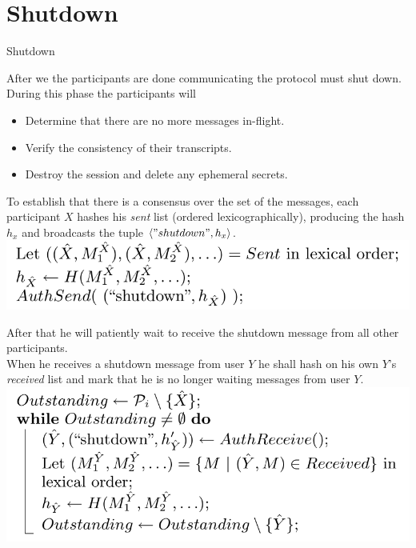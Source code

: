 \section{Shutdown}

\begin{frame}
\Huge{\centerline{Shutdown}}
\end{frame}

\begin{frame}
After we the participants are done communicating the protocol must shut down.
\vfill
During this phase the participants will

  \begin{itemize}
    \item Determine that there are no more messages in-flight.
    \item Verify the consistency of their transcripts.
    \item Destroy the session and delete any ephemeral secrets.
  \end{itemize}
\end{frame}


\begin{frame}
To establish that there is a consensus over the set of the messages, each participant $X$ hashes his \emph{sent} list (ordered lexicographically), producing the hash $h_x$ and broadcasts the tuple $\langle "shutdown", h_x \rangle$.\\[0.5cm]

\includegraphics[scale=0.4]{Figures/sent_hash.png}
\end{frame}

\begin{frame}
After that he will patiently wait to receive the shutdown message from all  other participants.\\[0.5cm]

When he receives a shutdown message from user $Y$ he shall hash on his own $Y$'s \emph{received} list  and mark that he is no longer waiting messages from user $Y$.\\[0.5cm]

\includegraphics[scale=0.4]{Figures/received_hashes.png}
\end{frame}

